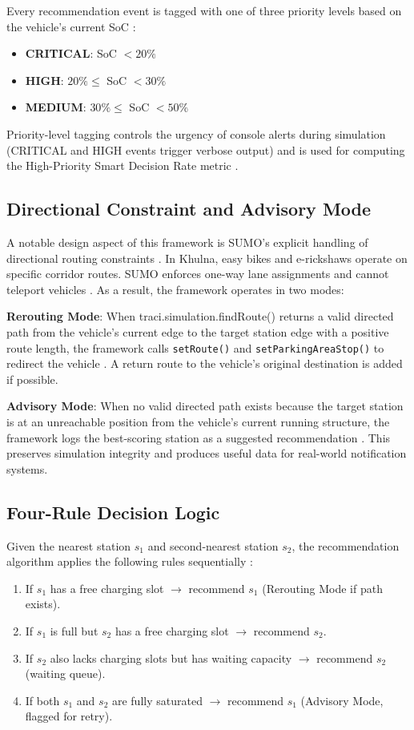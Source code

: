 \documentclass[conference]{IEEEtran}
\begin{document}
Every recommendation event is tagged with one of three priority levels based on the vehicle's current SoC \cite{b9, b20}:
\begin{itemize}
\item \textbf{CRITICAL}: SoC $< 20\%$
\item \textbf{HIGH}: $20\% \leq$ SoC $< 30\%$
\item \textbf{MEDIUM}: $30\% \leq$ SoC $< 50\%$
\end{itemize}

Priority-level tagging controls the urgency of console alerts during simulation (CRITICAL and HIGH events trigger verbose output) and is used for computing the High-Priority Smart Decision Rate metric \cite{b7}.

\subsection{Directional Constraint and Advisory Mode}

A notable design aspect of this framework is SUMO's explicit handling of directional routing constraints \cite{b10}. In Khulna, easy bikes and e-rickshaws operate on specific corridor routes. SUMO enforces one-way lane assignments and cannot teleport vehicles \cite{b2, b15}. As a result, the framework operates in two modes:

\textbf{Rerouting Mode}: When  {traci.simulation.findRoute()} returns a valid directed path from the vehicle's current edge to the target station edge with a positive route length, the framework calls \texttt{setRoute()} and \texttt{setParkingAreaStop()} to redirect the vehicle \cite{b11}. A return route to the vehicle's original destination is added if possible.

\textbf{Advisory Mode}: When no valid directed path exists because the target station is at an unreachable position from the vehicle's current running structure, the framework logs the best-scoring station as a suggested recommendation \cite{b17}. This preserves simulation integrity and produces useful data for real-world notification systems.

\subsection{Four-Rule Decision Logic}

Given the nearest station $s_1$ and second-nearest station $s_2$, the recommendation algorithm applies the following rules sequentially \cite{b7, b12}:
\begin{enumerate}
\item If $s_1$ has a free charging slot $\rightarrow$ recommend $s_1$ (Rerouting Mode if path exists).
\item If $s_1$ is full but $s_2$ has a free charging slot $\rightarrow$ recommend $s_2$.
\item If $s_2$ also lacks charging slots but has waiting capacity $\rightarrow$ recommend $s_2$ (waiting queue).
\item If both $s_1$ and $s_2$ are fully saturated $\rightarrow$ recommend $s_1$ (Advisory Mode, flagged for retry).
\end{enumerate}
\end{document}
